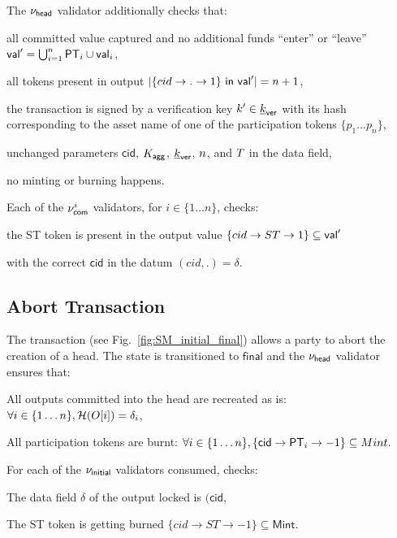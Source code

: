 The $\nu_\mathsf{head}$ validator additionally checks that:
\begin{menumerate}
  \item all committed value captured and no additional funds ``enter'' or ``leave''
  $\mathsf{val}' = \bigcup_{i=1}^{n} \mathsf{PT}_{i} \cup \mathsf{val}_{i}$,
  \item all tokens present in output
  $|\{cid \rightarrow . \rightarrow 1\} ~ \mathsf{in} ~ \mathsf{val}'| = n + 1$,
  \item the transaction is signed by a verification key $k' \in \underline{k}_{\mathsf{ver}}$ with its
  hash corresponding to the asset name of one of the participation tokens
  $\{p_1 \dots p_n\}$,
  \item unchanged parameters $\mathsf{cid}$, $K_{\mathsf{agg}}$, $\underline{k}_{\mathsf{ver}}$, $n$, and
  $T$ in the data field,
  \item no minting or burning happens.
\end{menumerate}

Each of the $\nu_\mathsf{com}^i$ validators, for $i \in \{ 1\dots n\}$, checks:
\begin{menumerate}
    \item the ST token is present in the output value $\{cid \rightarrow ST \rightarrow 1\} \subseteq \mathsf{val}'$
    \item with the correct $\mathsf{cid}$ in the datum $(cid,.) = \delta$.
\end{menumerate}

\subsection{Abort Transaction}\label{sec:abort-tx} 



The \mtxAbort{} transaction
(see Fig.~\ref{fig:SM_initial_final}) allows a party to abort the
creation of a head.  The state is transitioned to $\mathsf{final}$ and the $\nu_\mathsf{head}$ validator ensures that:
\begin{menumerate}
 \item All outputs committed into the head are recreated as is: $\forall i \in \{1\dots n\}, \mathcal{H}(O[i]) = \delta_i$,
 \item All participation tokens are burnt: $\forall i \in \{1\dots n\}, \{\mathsf{cid} \rightarrow \mathsf{PT}_i \rightarrow -1\} \subseteq Mint.$
\end{menumerate} 

For each of the $\nu_\mathsf{initial}$ validators consumed, checks:
\begin{menumerate}
  \item The data field $\delta$ of the output locked is $(\mathsf{cid}$,
  \item The ST token is getting burned $\{cid \rightarrow ST \rightarrow -1\} \subseteq \mathsf{Mint}.$ 
\end{menumerate}

